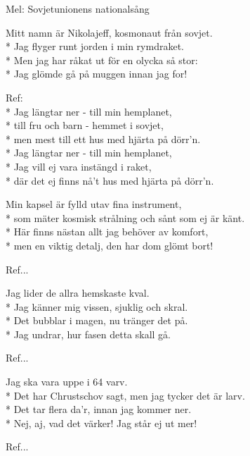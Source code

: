 \begin{SongText}
    \begin{SongInfo}
        Mel: Sovjetunionens nationalsång
    \end{SongInfo}
    \begin{SongVerse}
        Mitt namn är Nikolajeff, kosmonaut från sovjet.\\*%
        Jag flyger runt jorden i min rymdraket.\\*%
        Men jag har råkat ut för en olycka så stor:\\*%
        Jag glömde gå på muggen innan jag for!
    \end{SongVerse}
    \begin{SongVerse}
        Ref:\\*%
        Jag längtar ner - till min hemplanet,\\*%
        till fru och barn - hemmet i sovjet,\\*%
        men mest till ett hus med hjärta på dörr’n.\\*%
        Jag längtar ner - till min hemplanet,\\*%
        Jag vill ej vara instängd i raket,\\*%
        där det ej finns nå’t hus med hjärta på dörr’n.
    \end{SongVerse}
    \begin{SongVerse}
        Min kapsel är fylld utav fina instrument,\\*%
        som mäter kosmisk strålning och sånt som ej är känt.\\*%
        Här finns nästan allt jag behöver av komfort,\\*%
        men en viktig detalj, den har dom glömt bort!
    \end{SongVerse}
    \begin{SongVerse}
        Ref...
    \end{SongVerse}
    \begin{SongVerse}
        Jag lider de allra hemskaste kval.\\*%
        Jag känner mig vissen, sjuklig och skral.\\*%
        Det bubblar i magen, nu tränger det på.\\*%
        Jag undrar, hur fasen detta skall gå.
    \end{SongVerse}
    \begin{SongVerse}
        Ref...
    \end{SongVerse}
    \begin{SongVerse}
        Jag ska vara uppe i 64 varv.\\*%
        Det har Chrustschov sagt, men jag tycker det är larv.\\*%
        Det tar flera da’r, innan jag kommer ner.\\*%
        Nej, aj, vad det värker! Jag står ej ut mer!
    \end{SongVerse}
    \begin{SongVerse}
        Ref...
    \end{SongVerse}
\end{SongText}
